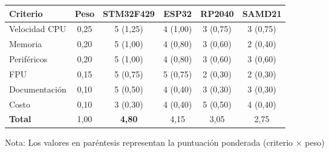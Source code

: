 	\begin{tabular}{lccccc}
		\toprule
		\textbf{Criterio} & \textbf{Peso} & \textbf{STM32F429} & \textbf{ESP32} & \textbf{RP2040} & \textbf{SAMD21} \\
		\midrule
		Velocidad CPU & 0,25 & 5 (1,25) & 4 (1,00) & 3 (0,75) & 3 (0,75) \\
		Memoria & 0,20 & 5 (1,00) & 4 (0,80) & 3 (0,60) & 2 (0,40) \\
		Periféricos & 0,20 & 5 (1,00) & 4 (0,80) & 3 (0,60) & 3 (0,60) \\
		FPU & 0,15 & 5 (0,75) & 5 (0,75) & 2 (0,30) & 2 (0,30) \\
		Documentación & 0,10 & 5 (0,50) & 4 (0,40) & 3 (0,30) & 3 (0,30) \\
		Costo & 0,10 & 3 (0,30) & 4 (0,40) & 5 (0,50) & 4 (0,40) \\
		\midrule
		\textbf{Total} & 1,00 & \textbf{4,80} & 4,15 & 3,05 & 2,75 \\
		\bottomrule
	\end{tabular}
	\caption*{Nota: Los valores en paréntesis representan la puntuación ponderada (criterio × peso)}